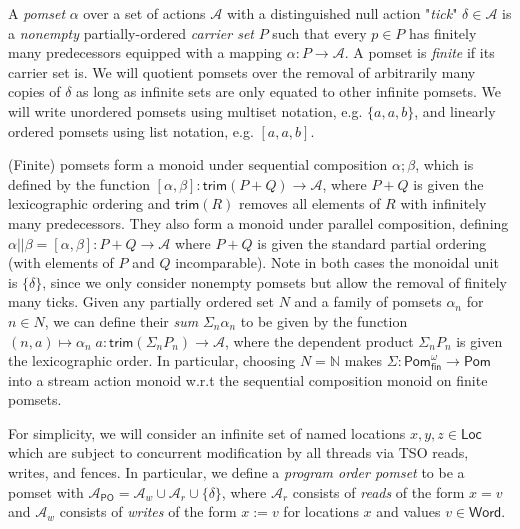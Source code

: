 \documentclass[acmsmall,screen,review]{acmart}
\newcommand{\mc}[1]{\ensuremath{\mathcal{#1}}}
\newcommand{\ms}[1]{\ensuremath{\mathsf{#1}}}
\newcommand{\nats}{\mathbb{N}}
\begin{document}
\begin{definition}[Pomset] 
  A \emph{pomset} \(\alpha\) over a set of actions \(\mc{A}\) with a distinguished null action
  "\emph{tick}" \(\delta \in \mc{A}\) is a \textit{nonempty} partially-ordered \emph{carrier set}
  \(P\) such that every \(p \in P\) has finitely many predecessors equipped with a mapping \(\alpha:
  P \to \mc{A}\). A pomset is \emph{finite} if its carrier set is. We will quotient pomsets over the
  removal of arbitrarily many copies of $\delta$ as long as infinite sets are only equated to other
  infinite pomsets. We will write unordered pomsets using multiset notation, e.g. \(\{a, a, b\}\),
  and linearly ordered pomsets using list notation, e.g. \([a, a, b]\).
\end{definition}

(Finite) pomsets form a monoid under sequential composition \(\alpha;\beta\), which is defined by
the function \([\alpha, \beta]: \ms{trim}(P + Q) \to \mc{A}\), where \(P + Q\) is given the
lexicographic ordering and \(\ms{trim}(R)\) removes all elements of \(R\) with infinitely many
predecessors. They also form a monoid under parallel composition, defining \(\alpha || \beta =
[\alpha, \beta]: P + Q \to \mc{A}\) where \(P + Q\) is given the standard partial ordering (with
elements of \(P\) and \(Q\) incomparable). Note in both cases the monoidal unit is \(\{\delta\}\),
since we only consider nonempty pomsets but allow the removal of finitely many ticks. Given any
partially ordered set \(N\) and a family of pomsets \(\alpha_n\) for \(n \in N\), we can define
their \textit{sum} \(\Sigma_n\alpha_n\) to be given by the function \((n, a) \mapsto \alpha_n\;a:
\ms{trim}(\Sigma_nP_n) \to \mc{A}\), where the dependent product \(\Sigma_nP_n\) is given the
lexicographic order. In particular, choosing \(N = \nats\) makes \(\Sigma:
\ms{Pom}_{\ms{fin}}^\omega \to \ms{Pom}\) into a stream action monoid w.r.t the sequential
composition monoid on finite pomsets. 

For simplicity, we will consider an infinite set of named locations \(x, y, z \in \ms{Loc}\) which
are subject to concurrent modification by all threads via TSO reads, writes, and fences. In
particular, we define a \emph{program order pomset} to be a pomset with \(\mc{A}_{\ms{PO}} =
\mc{A}_w \cup \mc{A}_r \cup \{\delta\}\), where \(\mc{A}_r\) consists of \textit{reads} of the form
\(x = v\) and \(\mc{A}_w\) consists of \textit{writes} of the form \(x := v\) for locations \(x\)
and values \(v \in \ms{Word}\). 
\end{document}

